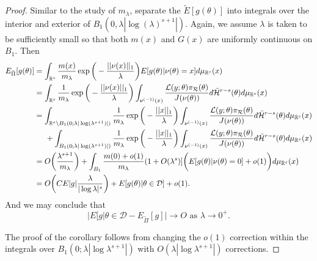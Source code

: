 \documentclass[10pt,fleqn]{article}
\DeclareMathOperator{\1}{\mathbbm{1}}
\begin{document}
\begin{proof}
Similar to the study of $m_\lambda$, separate the $\tilde{E}[g(\theta)]$ into integrals over the interior and exterior of $B_1(0,\lambda|\log(\lambda)^{s+1}|)$. Again, we assume $\lambda$ is taken to be sufficiently small so that both $m(x)$ and $G(x)$ are uniformly continuous on $B_1$. Then 
\begin{align*}
E_{\tilde{\Pi}}[g(\theta)] &= \int_{\mathbb{R}^s} \frac{m(x)}{m_\lambda}\exp\bigg(-\frac{||\nu(x)||_1}{\lambda}\bigg)E[g(\theta)|\nu(\theta)=x]d\mu_{\mathbb{R}^s}(x) \\
&= \int_{\mathbb{R}^s} \frac{1}{m_\lambda}\exp\bigg(-\frac{||\nu(x)||_1}{\lambda}\bigg)\int_{\nu^{(-1)}(x)} \frac{\mathcal{L}(y;\theta)\pi_\mathcal{R}(\theta)}{J(\nu(\theta))}d\bar{\mathcal{H}}^{r-s}(\theta) d\mu_{\mathbb{R}^s}(x) \\
&=\int_{\mathbb{R}^s \setminus B_1(0;\lambda|\log(\lambda^{s+1})|)} \frac{1}{m_\lambda}\exp\bigg(-\frac{||x||_1}{\lambda}\bigg) \int_{\nu^{(-1)}(x)} \frac{\mathcal{L}(y;\theta)\pi_\mathcal{R}(\theta)}{J(\nu(\theta))}d\bar{\mathcal{H}}^{r-s}(\theta) d\mu_{\mathbb{R}^s}(x) \\
&\hspace{0.5 cm} + \int_{B_1(0;\lambda|\log(\lambda^{s+1})|)} \frac{1}{m_\lambda}\exp\bigg(-\frac{||x||_1}{\lambda}\bigg) \int_{\nu^{(-1)}(x)} \frac{\mathcal{L}(y;\theta)\pi_\mathcal{R}(\theta)}{J(\nu(\theta))}d\bar{\mathcal{H}}^{r-s}(\theta)  d\mu_{\mathbb{R}^s}(x) \\
&= O\bigg( \frac{\lambda^{s+1}}{m_\lambda} \bigg) + \int_{B_1} \frac{m(0)+o(1)}{m_\lambda}(1+O(\lambda^s)]\bigg(E[g(\theta)|\nu(\theta)=0] + o(1) \bigg) d\mu_{\mathbb{R}^s}(x)  \\
&= O\bigg( C E|g|\frac{\lambda}{|\log\lambda|^s}\bigg) + E[g(\theta)|\theta \in \mathcal{D}] + o(1).
\end{align*}
And we may conclude that $$\bigg|E[g|\theta\in\mathcal{D} - E_{\tilde{\Pi}}[g] \bigg| \to O \text{ as } \lambda\to0^+.$$

The proof of the corollary follows from changing the $o(1)$ correction within the integrals over $B_1(0;\lambda|\log \lambda^{s+1}|)$ with $O(\lambda |\log \lambda^{s+1}|)$ corrections. 
\end{proof}




\end{document}
